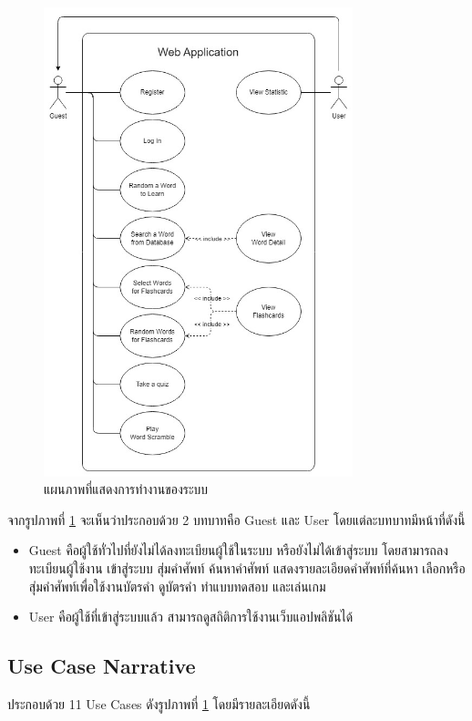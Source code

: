 \documentclass[12pt,oneside,openright,a4paper]{cpe-thai-project}
\begin{document}
\begin{figure}[!h]\centering
	\includegraphics[width=0.8\textwidth, keepaspectratio=true]{image/chap3/UseCaseDiagram.jpg}
	\caption{แผนภาพที่แสดงการทำงานของระบบ}\label{fig:UseCaseDiagram}
\end{figure}

\hspace{1cm}
จากรูปภาพที่ \ref{fig:UseCaseDiagram} จะเห็นว่าประกอบด้วย 2 บทบาทคือ Guest และ User โดยแต่ละบทบาทมีหน้าที่ดังนี้
\begin{itemize}
	\item Guest คือผู้ใช้ทั่วไปที่ยังไม่ได้ลงทะเบียนผู้ใช้ในระบบ หรือยังไม่ได้เข้าสู่ระบบ
	      โดยสามารถลงทะเบียนผู้ใช้งาน เข้าสู่ระบบ สุ่มคำศัพท์ ค้นหาคำศัพท์ แสดงรายละเอียดคำศัพท์ที่ค้นหา
	      เลือกหรือสุ่มคำศัพท์เพื่อใช้งานบัตรคำ ดูบัตรคำ ทำแบบทดสอบ และเล่นเกม
	\item User คือผู้ใช้ที่เข้าสู่ระบบแล้ว สามารถดูสถิติการใช้งานเว็บแอปพลิชันได้
\end{itemize}

\subsection{Use Case Narrative}
ประกอบด้วย 11 Use Cases ดังรูปภาพที่ \ref{fig:UseCaseDiagram} โดยมีรายละเอียดดังนี้
\end{document}
